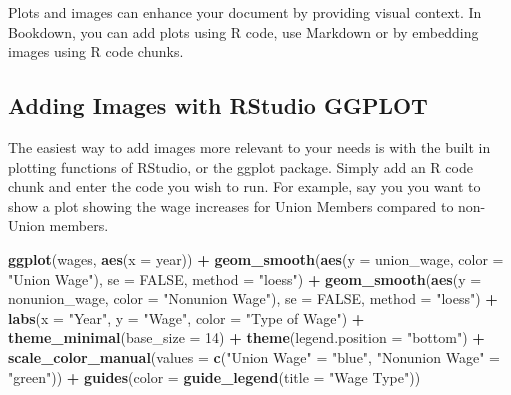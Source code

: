 \documentclass[
]{book}
\newenvironment{Shaded}{\begin{snugshade}}{\end{snugshade}}
\newcommand{\AttributeTok}[1]{\textcolor[rgb]{0.13,0.29,0.53}{#1}}
\newcommand{\ConstantTok}[1]{\textcolor[rgb]{0.56,0.35,0.01}{#1}}
\newcommand{\DecValTok}[1]{\textcolor[rgb]{0.00,0.00,0.81}{#1}}
\newcommand{\FunctionTok}[1]{\textcolor[rgb]{0.13,0.29,0.53}{\textbf{#1}}}
\newcommand{\NormalTok}[1]{#1}
\newcommand{\OtherTok}[1]{\textcolor[rgb]{0.56,0.35,0.01}{#1}}
\newcommand{\SpecialCharTok}[1]{\textcolor[rgb]{0.81,0.36,0.00}{\textbf{#1}}}
\newcommand{\StringTok}[1]{\textcolor[rgb]{0.31,0.60,0.02}{#1}}
\theoremstyle{definition}
\theoremstyle{definition}
\theoremstyle{definition}
\theoremstyle{definition}
\theoremstyle{remark}
\begin{document}
Plots and images can enhance your document by providing visual context. In Bookdown, you can add plots using R code, use Markdown or by embedding images using R code chunks.

\subsection{Adding Images with RStudio GGPLOT}\label{adding-images-with-rstudio-ggplot}

The easiest way to add images more relevant to your needs is with the built in plotting functions of RStudio, or the ggplot package. Simply add an R code chunk and enter the code you wish to run. For example, say you you want to show a plot showing the wage increases for Union Members compared to non-Union members.

\begin{Shaded}
\begin{Highlighting}[]
\FunctionTok{ggplot}\NormalTok{(wages, }\FunctionTok{aes}\NormalTok{(}\AttributeTok{x =}\NormalTok{ year)) }\SpecialCharTok{+}
  \FunctionTok{geom\_smooth}\NormalTok{(}\FunctionTok{aes}\NormalTok{(}\AttributeTok{y =}\NormalTok{ union\_wage, }\AttributeTok{color =} \StringTok{"Union Wage"}\NormalTok{), }
              \AttributeTok{se =} \ConstantTok{FALSE}\NormalTok{, }\AttributeTok{method =} \StringTok{"loess"}\NormalTok{) }\SpecialCharTok{+}
  \FunctionTok{geom\_smooth}\NormalTok{(}\FunctionTok{aes}\NormalTok{(}\AttributeTok{y =}\NormalTok{ nonunion\_wage, }\AttributeTok{color =} \StringTok{"Nonunion Wage"}\NormalTok{), }
              \AttributeTok{se =} \ConstantTok{FALSE}\NormalTok{, }\AttributeTok{method =} \StringTok{"loess"}\NormalTok{) }\SpecialCharTok{+}
  \FunctionTok{labs}\NormalTok{(}\AttributeTok{x =} \StringTok{"Year"}\NormalTok{, }\AttributeTok{y =} \StringTok{"Wage"}\NormalTok{,}
       \AttributeTok{color =} \StringTok{"Type of Wage"}\NormalTok{) }\SpecialCharTok{+}
  \FunctionTok{theme\_minimal}\NormalTok{(}\AttributeTok{base\_size =} \DecValTok{14}\NormalTok{) }\SpecialCharTok{+}
  \FunctionTok{theme}\NormalTok{(}\AttributeTok{legend.position =} \StringTok{"bottom"}\NormalTok{) }\SpecialCharTok{+}
  \FunctionTok{scale\_color\_manual}\NormalTok{(}\AttributeTok{values =} \FunctionTok{c}\NormalTok{(}\StringTok{"Union Wage"} \OtherTok{=} \StringTok{"blue"}\NormalTok{, }\StringTok{"Nonunion Wage"} \OtherTok{=} \StringTok{"green"}\NormalTok{)) }\SpecialCharTok{+}
  \FunctionTok{guides}\NormalTok{(}\AttributeTok{color =} \FunctionTok{guide\_legend}\NormalTok{(}\AttributeTok{title =} \StringTok{"Wage Type"}\NormalTok{))}
\end{Highlighting}
\end{Shaded}
\end{document}
